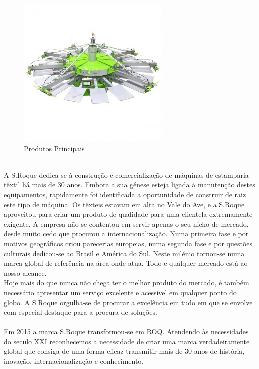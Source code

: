 {\begin{figure}[ht]
\begin{center}
\includegraphics[scale=0.5]{"./image/ROQ/maquinas/You-600x600-275x275"}
\end{center}
\caption{Produtos Principais}
\end{figure}
\\
\newpage
A S.Roque dedica-se à construção e comercialização de máquinas de estamparia têxtil há mais de 30 anos. Embora a sua génese esteja ligada à manutenção destes equipamentos, rapidamente foi identificada a oportunidade de construir de raiz este tipo de máquina. Os têxteis estavam em alta no Vale do Ave, e a S.Roque aproveitou para criar um produto de qualidade para uma clientela extremamente exigente. A empresa não se contentou em servir apenas o seu nicho de mercado, desde muito cedo que procurou a internacionalização. Numa primeira fase e por motivos geográficos criou parecerias europeias, numa segunda fase e por questões culturais dedicou-se ao Brasil e América do Sul. Neste milénio tornou-se numa marca global de referência na área onde atua. Todo e qualquer mercado está ao nosso alcance.\\
Hoje mais do que nunca não chega ter o melhor produto do mercado, é também necessário apresentar um serviço excelente e acessível em qualquer ponto do globo. A S.Roque orgulha-se de procurar a excelência em tudo em que se envolve com especial destaque para a procura de soluções.\\
\\
Em 2015 a marca S.Roque transformou-se em ROQ. Atendendo às necessidades do seculo XXI reconhecemos a necessidade de criar uma marca verdadeiramente global que consiga de uma forma eficaz transmitir mais de 30 anos de história, inovação, internacionalização e conhecimento.

\newpage
}
